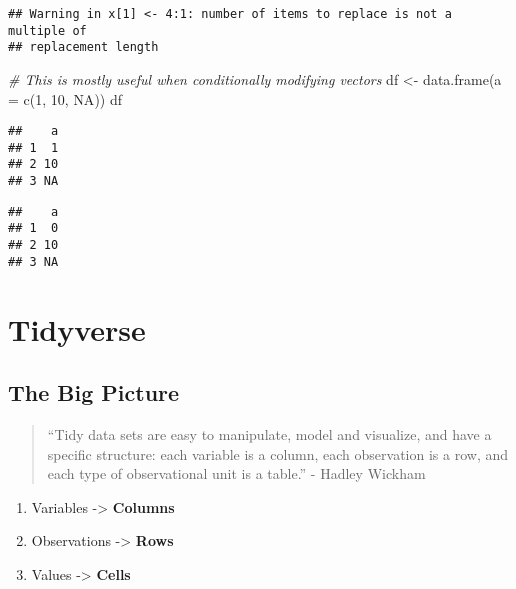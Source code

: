 \documentclass[
]{book}
\newenvironment{Shaded}{\begin{snugshade}}{\end{snugshade}}
\newcommand{\AttributeTok}[1]{\textcolor[rgb]{0.77,0.63,0.00}{#1}}
\newcommand{\CommentTok}[1]{\textcolor[rgb]{0.56,0.35,0.01}{\textit{#1}}}
\newcommand{\ConstantTok}[1]{\textcolor[rgb]{0.00,0.00,0.00}{#1}}
\newcommand{\DecValTok}[1]{\textcolor[rgb]{0.00,0.00,0.81}{#1}}
\newcommand{\FunctionTok}[1]{\textcolor[rgb]{0.00,0.00,0.00}{#1}}
\newcommand{\NormalTok}[1]{#1}
\newcommand{\OtherTok}[1]{\textcolor[rgb]{0.56,0.35,0.01}{#1}}
\newcommand{\SpecialCharTok}[1]{\textcolor[rgb]{0.00,0.00,0.00}{#1}}
\providecommand{\tightlist}{%
  \setlength{\itemsep}{0pt}\setlength{\parskip}{0pt}}
\begin{document}
\begin{verbatim}
## Warning in x[1] <- 4:1: number of items to replace is not a multiple of
## replacement length
\end{verbatim}

\begin{Shaded}
\begin{Highlighting}[]
\CommentTok{\# This is mostly useful when conditionally modifying vectors}
\NormalTok{df }\OtherTok{\textless{}{-}} \FunctionTok{data.frame}\NormalTok{(}\AttributeTok{a =} \FunctionTok{c}\NormalTok{(}\DecValTok{1}\NormalTok{, }\DecValTok{10}\NormalTok{, }\ConstantTok{NA}\NormalTok{))}
\NormalTok{df}
\end{Highlighting}
\end{Shaded}

\begin{verbatim}
##    a
## 1  1
## 2 10
## 3 NA
\end{verbatim}

\begin{Shaded}
\end{Shaded}

\begin{verbatim}
##    a
## 1  0
## 2 10
## 3 NA
\end{verbatim}

\hypertarget{tidyverse}{%
\section{Tidyverse}\label{tidyverse}}

\hypertarget{the-big-picture-5}{%
\subsection{The Big Picture}\label{the-big-picture-5}}

\begin{quote}
``Tidy data sets are easy to manipulate, model and visualize, and have a specific structure: each variable is a column, each observation is a row, and each type of observational unit is a table.'' - Hadley Wickham
\end{quote}

\begin{enumerate}
\def\labelenumi{\arabic{enumi}.}
\tightlist
\item
  Variables -\textgreater{} \textbf{Columns}
\item
  Observations -\textgreater{} \textbf{Rows}
\item
  Values -\textgreater{} \textbf{Cells}
\end{enumerate}
\end{document}

